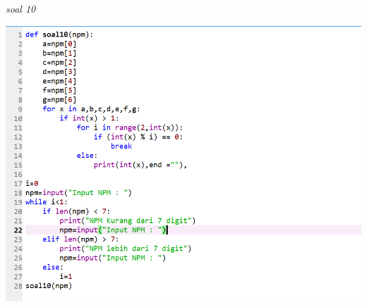 \documentclass{article}
\begin{document}
\textit{soal 10}
\begin{center}
    \includegraphics[width=15cm\textwidth]{figure/10.png}
\end{center}
\end{document}
